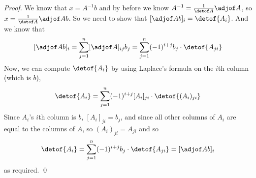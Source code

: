 \begin{proof}

    We know that $x=A^{-1}b$ and by before we know $A^{-1}=\frac1{\detof A}\adjof A$, so $x=\frac1{\detof A}\adjof A b$.
    So we need to show that $[\adjof A b]_i=\detof{A_i}$.
    And we know that
    \[ [\adjof A b]_i = \sum_{j=1}^n [\adjof A]_{ij} b_j = \sum_{j=1}^n (-1)^{i+j} b_j\cdot\detof{A_{ji}} \]
    Now, we can compute $\detof{A_i}$ by using Laplace's formula on the $i$th column (which is $b$),
    \[ \detof{A_i} = \sum_{j=1}^n (-1)^{i+j} [A_i]_{ji}\cdot\detof{(A_i)_{ji}} \]
    Since $A_i$'s $i$th column is $b$, $[A_i]_{ji}=b_j$, and since all other columns of $A_i$ are equal to the columns of $A$, so $(A_i)_{ji}=A_{ji}$ and so
    \[ \detof{A_i} = \sum_{j=1}^n (-1)^{i+j} b_j\cdot\detof{A_{ji}} = [\adjof A b]_i \]
    as required.
    \qed

\end{proof}


